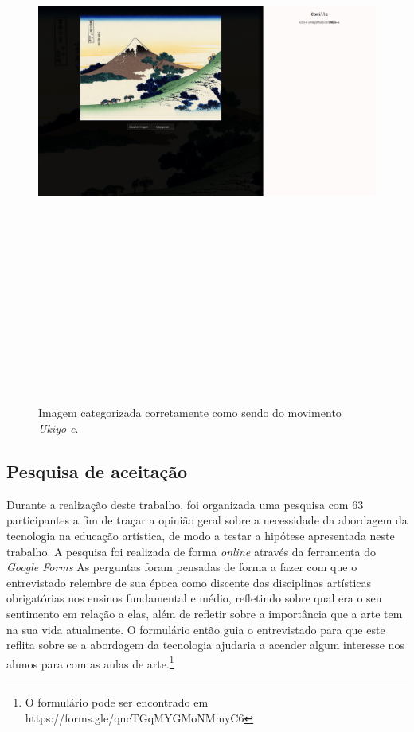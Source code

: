 \documentclass[12pt, a4paper]{article}
\begin{document}
\begin{figure}[H]
	\centering
	\includegraphics[width=\textwidth, height=20cm, keepaspectratio=true]{fig/site_imgcategorized}
	\caption{Imagem categorizada corretamente como sendo do movimento \emph{Ukiyo-e}.}
\end{figure}

\subsection{Pesquisa de aceitação}
Durante a realização deste trabalho, foi organizada uma pesquisa com 63 participantes a fim de traçar a opinião geral sobre a necessidade da abordagem da tecnologia na educação artística, de modo a testar a hipótese apresentada neste trabalho. A pesquisa foi realizada de forma \emph{online} através da ferramenta do 
\emph{Google Forms}
As perguntas foram pensadas de forma a fazer com que o entrevistado relembre de sua época como discente das disciplinas artísticas obrigatórias nos ensinos fundamental e médio, refletindo sobre qual era o seu sentimento em relação a elas, além de refletir sobre a importância que a arte tem na sua vida atualmente. O formulário então guia o entrevistado para que este reflita sobre se a abordagem da tecnologia ajudaria a acender algum interesse nos alunos para com as aulas de arte.\footnote{O formulário pode ser encontrado em https://forms.gle/qncTGqMYGMoNMmyC6}
\end{document}
